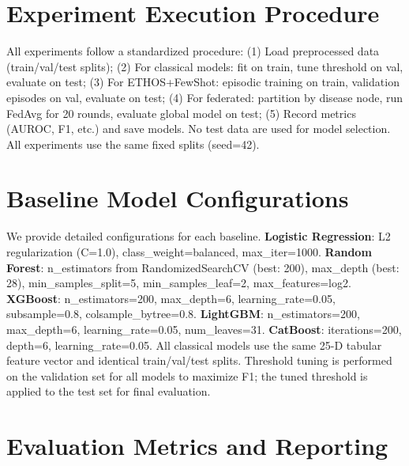 \section{Experiment Execution Procedure}

All experiments follow a standardized procedure: (1) Load preprocessed data (train/val/test splits); (2) For classical models: fit on train, tune threshold on val, evaluate on test; (3) For ETHOS+FewShot: episodic training on train, validation episodes on val, evaluate on test; (4) For federated: partition by disease node, run FedAvg for 20 rounds, evaluate global model on test; (5) Record metrics (AUROC, F1, etc.) and save models. No test data are used for model selection. All experiments use the same fixed splits (seed=42).

\section{Baseline Model Configurations}

We provide detailed configurations for each baseline. \textbf{Logistic Regression}: L2 regularization (C=1.0), class\_weight=balanced, max\_iter=1000. \textbf{Random Forest}: n\_estimators from RandomizedSearchCV (best: 200), max\_depth (best: 28), min\_samples\_split=5, min\_samples\_leaf=2, max\_features=log2. \textbf{XGBoost}: n\_estimators=200, max\_depth=6, learning\_rate=0.05, subsample=0.8, colsample\_bytree=0.8. \textbf{LightGBM}: n\_estimators=200, max\_depth=6, learning\_rate=0.05, num\_leaves=31. \textbf{CatBoost}: iterations=200, depth=6, learning\_rate=0.05. All classical models use the same 25-D tabular feature vector and identical train/val/test splits. Threshold tuning is performed on the validation set for all models to maximize F1; the tuned threshold is applied to the test set for final evaluation.

\section{Evaluation Metrics and Reporting}

